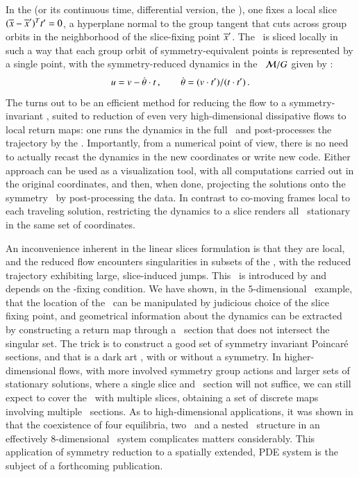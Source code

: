 \documentclass[final,number,sort&compress]{elsarticle}
\begin{document}
In the \emph{\mframes} (or its continuous time, differential
version, the \emph{\mslices}), one fixes a local slice
$(\overline{x} - {\overline{x}'} )^T t' =0$, a hyperplane normal
to the group tangent \sliceTan{} that cuts across group
orbits in the neighborhood of the slice-fixing point
${\overline{x}'}$. The \statesp\ is sliced locally in such a way
that each group orbit of symmetry-equivalent points is
represented by a single point, with the symmetry-reduced
dynamics in the \reducedsp\ ${\cal M}/G$ given by
:
\[
u = v - \dot{{\bf \theta}}  \cdot t
    \,,\qquad
\dot{{\bf \theta}} = (v \cdot t')/(t \cdot t')
\,.
\]
The {\mframes}
turns out to be an efficient method for reducing the
flow to a symmetry-in\-vari\-ant \reducedsp, suited to reduction
of {even very high-dimensional}
dissipative flows to local return maps:
one runs the dynamics in the full \statesp\ and
post-processes the trajectory by the \mframes.
Importantly, from a numerical point of  view,
there is no need to
actually recast the dynamics in the new coordinates or
write new code. Either
approach can be used as a visualization tool, with all
computations carried out in the original coordinates, and
then, when done, projecting the solutions onto the symmetry
\reducedsp\ by post-processing the data.
In contrast to co-moving frames local to each traveling
solution, {restricting the dynamics}
to a slice renders all \reqva\
stationary in the same set of coordinates.

An inconvenience inherent in the linear slices formulation is that they are
local, and the reduced flow encounters singularities in
subsets of the \reducedsp, with the reduced trajectory exhibiting
large, slice-induced jumps.
This \sset\ is introduced by and
depends on the \slice-fixing condition. We have shown,
in the $5$-dimensional \cLe\ example, that the location of
the \sset\ can be manipulated by judicious choice of the slice
fixing point, and geometrical information about the dynamics can
be extracted by constructing a return map through a
\Poincare\ section that does not intersect the singular set.
The trick is to
construct a good set of symmetry in\-vari\-ant Poincar\'e
sections, and that is a dark art , with or without a
symmetry.
In higher-dimensional flows, with more involved symmetry
group actions and larger sets of stationary solutions, where a
single slice and \Poincare\ section will not suffice, we can
still expect to cover the \reducedsp\ with multiple slices,
obtaining a set of discrete maps involving multiple
\Poincare\ sections. As to high-dimensional applications,
it was shown in  that the coexistence
of four equilibria, two \reqva\ and a nested \fixedsp\
structure in an effectively $8$-dimensional \KS\
system complicates matters considerably. This
application of symmetry reduction to a spatially extended,
PDE system is the
subject of a forthcoming publication\rf{SCD09b}.
\end{document}
